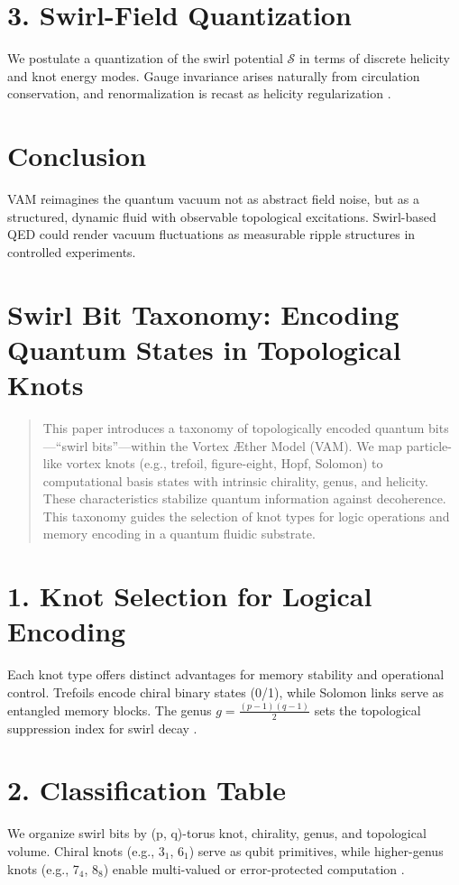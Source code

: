 \documentclass[a4paper,11pt]{article}
\begin{document}
\section*{3. Swirl-Field Quantization}
We postulate a quantization of the swirl potential \( \mathcal{S} \) in terms of discrete helicity and knot energy modes. Gauge invariance arises naturally from circulation conservation, and renormalization is recast as helicity regularization \cite{Faddeev1999}.

\section*{Conclusion}
VAM reimagines the quantum vacuum not as abstract field noise, but as a structured, dynamic fluid with observable topological excitations. Swirl-based QED could render vacuum fluctuations as measurable ripple structures in controlled experiments.


\section{Swirl Bit Taxonomy: Encoding Quantum States in Topological Knots}

\begin{abstract}
This paper introduces a taxonomy of topologically encoded quantum bits—``swirl bits''—within the Vortex Æther Model (VAM). We map particle-like vortex knots (e.g., trefoil, figure-eight, Hopf, Solomon) to computational basis states with intrinsic chirality, genus, and helicity. These characteristics stabilize quantum information against decoherence. This taxonomy guides the selection of knot types for logic operations and memory encoding in a quantum fluidic substrate.
\end{abstract}

\section*{1. Knot Selection for Logical Encoding}
Each knot type offers distinct advantages for memory stability and operational control. Trefoils encode chiral binary states (0/1), while Solomon links serve as entangled memory blocks. The genus \( g = \frac{(p-1)(q-1)}{2} \) sets the topological suppression index for swirl decay \cite{Kauffman1991}.

\section*{2. Classification Table}
We organize swirl bits by (p, q)-torus knot, chirality, genus, and topological volume. Chiral knots (e.g., 3$_1$, 6$_1$) serve as qubit primitives, while higher-genus knots (e.g., 7$_4$, 8$_8$) enable multi-valued or error-protected computation \cite{Hoste1998}.
\end{document}
